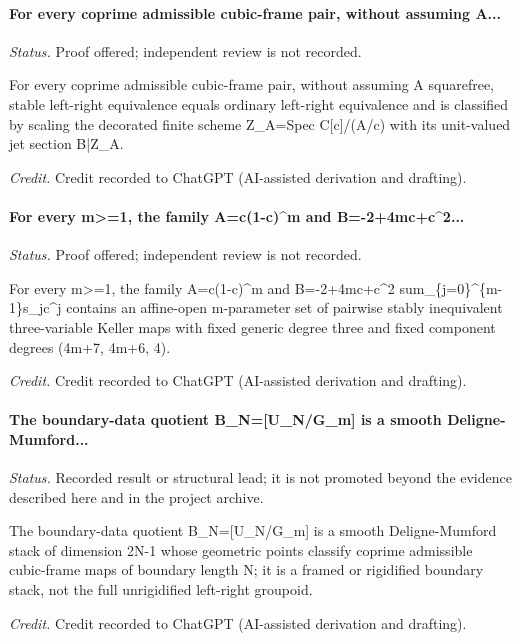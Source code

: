 \paragraph{For every coprime admissible cubic-frame pair, without assuming A...}
\emph{Status.} Proof offered; independent review is not recorded.

For every coprime admissible cubic-frame pair, without assuming A squarefree, stable left-right equivalence equals ordinary left-right equivalence and is classified by scaling the decorated finite scheme Z\_A=Spec C[c]/(A/c) with its unit-valued jet section B|Z\_A.

\emph{Credit.} Credit recorded to ChatGPT (AI-assisted derivation and drafting).

\label{supp-note-04-018}
\paragraph{For every m>=1, the family A=c(1-c)\textasciicircum{}m and B=-2+4mc+c\textasciicircum{}2...}
\emph{Status.} Proof offered; independent review is not recorded.

For every m>=1, the family A=c(1-c)\textasciicircum{}m and B=-2+4mc+c\textasciicircum{}2 sum\_\{j=0\}\textasciicircum{}\{m-1\}s\_jc\textasciicircum{}j contains an affine-open m-parameter set of pairwise stably inequivalent three-variable Keller maps with fixed generic degree three and fixed component degrees (4m+7, 4m+6, 4).

\emph{Credit.} Credit recorded to ChatGPT (AI-assisted derivation and drafting).

\label{supp-note-04-019}
\paragraph{The boundary-data quotient B\_N=[U\_N/G\_m] is a smooth Deligne-Mumford...}
\emph{Status.} Recorded result or structural lead; it is not promoted beyond the evidence described here and in the project archive.

The boundary-data quotient B\_N=[U\_N/G\_m] is a smooth Deligne-Mumford stack of dimension 2N-1 whose geometric points classify coprime admissible cubic-frame maps of boundary length N; it is a framed or rigidified boundary stack, not the full unrigidified left-right groupoid.

\emph{Credit.} Credit recorded to ChatGPT (AI-assisted derivation and drafting).

\label{supp-note-04-020}
